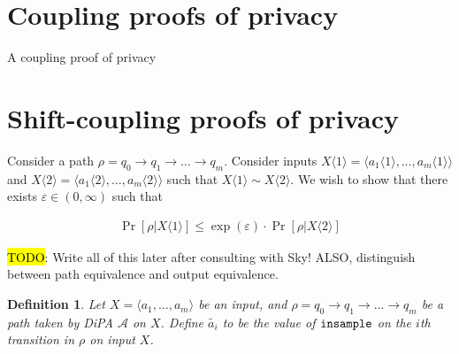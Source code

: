 \documentclass{article}
\newtheorem{definition}{Definition}[section]
\renewcommand{\epsilon}{\varepsilon}
\newcommand{\insample}{\textup{\texttt{insample}}}
\newcommand{\1}{\langle 1 \rangle}
\newcommand{\2}{\langle 2 \rangle}
\begin{document}
\newpage
\section{Coupling proofs of privacy}

A coupling proof of privacy 

\newpage
\section{Shift-coupling proofs of privacy}

Consider a path $\rho = q_0 \to q_1 \to \dots \to q_m$. Consider inputs $X \langle 1 \rangle = \langle a_1 \langle 1 \rangle, \dots, a_m \langle 1 \rangle \rangle$ and $X \langle 2 \rangle = \langle a_1 \langle 2 \rangle, \dots, a_m \langle 2 \rangle \rangle$ such that $X \langle 1 \rangle \sim X \langle 2 \rangle$. We wish to show that there exists $\epsilon \in (0, \infty)$ such that

\begin{align*}
    \Pr\left[\rho | X \langle 1 \rangle \right] \leq \exp(\epsilon) \cdot \Pr\left[\rho | X \langle 2 \rangle\right]
\end{align*}

\hl{TODO}: Write all of this later after consulting with Sky! ALSO, distinguish between path equivalence and output equivalence.

\begin{definition}
    Let  $X = \langle a_1, \dots, a_m \rangle$ be an input, and $\rho = q_0 \to q_1 \to \dots \to q_m$ be a path taken by DiPA $\mathcal{A}$ on $X$. Define $\tilde{a_i}$ to be the value of $\insample$ on the $i$th transition in $\rho$ on input $X$.
\end{definition}
\end{document}

